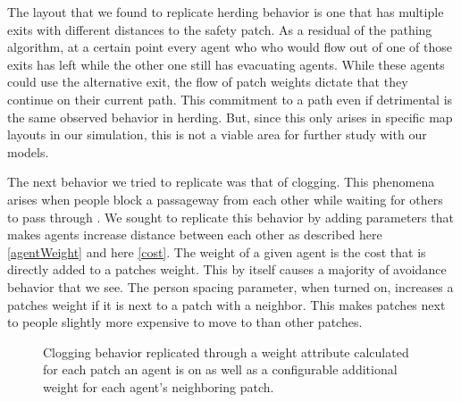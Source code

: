 \documentclass[12pt,letterpaper]{article}
\begin{document}
The layout that we found to replicate herding behavior is one that has multiple exits with different distances to the safety patch.  As a residual of the pathing algorithm, at a certain point every agent who who would flow out of one of those exits has left while the other one still has evacuating agents.  While these agents could use the alternative exit, the flow of patch weights dictate that they continue on their current path.  This commitment to a path even if detrimental is the same observed behavior in herding.  But, since this only arises in specific map layouts in our simulation, this is not a viable area for further study with our models. 

The next behavior we tried to replicate was that of clogging.  This phenomena arises when people block a passageway from each other while waiting for others to pass through \cite{almeidaCrowdSimulationModeling2013}.  We sought to replicate this behavior by adding parameters that makes agents increase distance between each other as described here \ref{agentWeight} and here \ref{cost}.  The weight of a given agent is the cost that is directly added to a patches weight.  This by itself causes a majority of avoidance behavior that we see. The person spacing parameter, when turned on, increases a patches weight if it is next to a patch with a neighbor.  This makes patches next to people slightly more expensive to move to than other patches.  


\begin{figure}[!htbp]
  \centering
  \hfill
  \caption{Clogging behavior replicated through a weight attribute calculated for each patch an agent is on as well as a configurable additional weight for each agent's neighboring patch. }
  \label{clogging}
\end{figure}
\end{document}
